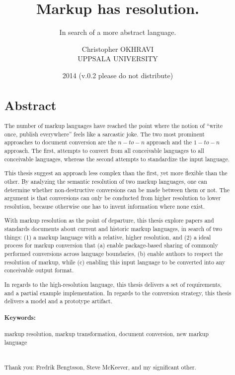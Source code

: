 \documentclass{scrreprt}
\date{2014 \smaller(v.0.2 please do not distribute)}
\title{ Markup has resolution. }
\subtitle{In search of a more abstract language.}
\author{ Christopher OKHRAVI \\ UPPSALA UNIVERSITY }
\begin{document}
\maketitle






%
%
%
%
%
%


\begin{abstract}
\section*{Abstract}
The number of markup languages have reached the point where the notion of ``write once, publish everywhere'' feels like a sarcastic joke. The two most prominent approaches to document conversion are the $n-to-n$ approach and the $1-to-n$ approach. The first, attempts to convert from all conceivable languages to all conceivable languages, whereas the second attempts to standardize the input language.

This thesis suggest an approach less complex than the first, yet more flexible than the other. By analyzing the semantic resolution of two markup languages, one can determine whether non-destructive conversions can be made between them or not. The argument is that conversions can only be conducted from higher resolution to lower resolution, because otherwise one has to invent information where none exist.

With markup resolution as the point of departure, this thesis explore papers and standards documents about current and historic markup languages, in search of two things: (1) a markup language with a relative, higher resolution, and (2) a ideal process for markup conversion that (a) enable package-based sharing of commonly performed conversions across language boundaries, (b) enable authors to respect the resolution of markup, while (c) enabling this input language to be converted into any conceivable output format.

In regards to the high-resolution language, this thesis delivers a set of requirements, and a partial example implementation. In regards to the conversion strategy, this thesis delivers a model and a prototype artifact.\\


\paragraph{Keywords:} markup resolution, markup transformation, document conversion, new markup language \\ \\


\smaller
\paragraph{}
\noindent Thank you: Fredrik Bengtsson, Steve McKeever, and my significant other.
\end{abstract}
\end{document}
